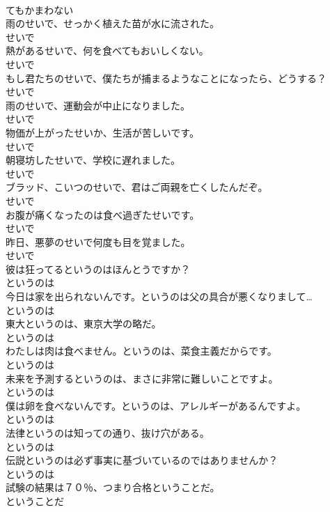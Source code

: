 \documentclass[8pt]{extreport}
\begin{document}
\begin{CJK}{UTF8}{min}
\\	てもかまわない
\\	雨のせいで、せっかく植えた苗が水に流された。	
\\	せいで
\\	熱があるせいで、何を食べてもおいしくない。	
\\	せいで
\\	もし君たちのせいで、僕たちが捕まるようなことになったら、どうする？	
\\	せいで
\\	雨のせいで、運動会が中止になりました。	
\\	せいで
\\	物価が上がったせいか、生活が苦しいです。	
\\	せいで
\\	朝寝坊したせいで、学校に遅れました。	
\\	せいで
\\	ブラッド、こいつのせいで、君はご両親を亡くしたんだぞ。	
\\	せいで
\\	お腹が痛くなったのは食べ過ぎたせいです。	
\\	せいで
\\	昨日、悪夢のせいで何度も目を覚ました。	
\\	せいで
\\	彼は狂ってるというのはほんとうですか？	
\\	というのは
\\	今日は家を出られないんです。というのは父の具合が悪くなりまして…	
\\	というのは
\\	東大というのは、東京大学の略だ。	
\\	というのは
\\	わたしは肉は食べません。というのは、菜食主義だからです。	
\\	というのは
\\	未来を予測するというのは、まさに非常に難しいことですよ。	
\\	というのは
\\	僕は卵を食べないんです。というのは、アレルギーがあるんですよ。	
\\	というのは
\\	法律というのは知っての通り、抜け穴がある。	
\\	というのは
\\	伝説というのは必ず事実に基づいているのではありませんか？	
\\	というのは
\\	試験の結果は７０％、つまり合格ということだ。	
\\	ということだ

\end{CJK}
\end{document}
